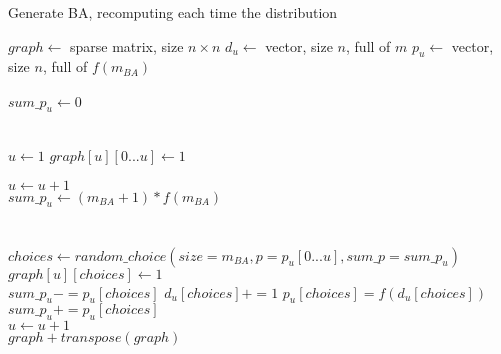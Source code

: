 \begin{algorithm}
	\caption{Generate BA, recomputing each time the distribution}
	\label{algo:ba}
	\begin{algorithmic}[1]
		
		\State $graph \gets$ sparse matrix, size $n\times n$
		\State $d_u \gets$ vector, size $n$, full of $m$ 
		\State $p_u \gets$ vector, size $n$, full of $f(m_{BA})$
		\\ 
		\\
		\State $sum\_p_u \gets 0$  
		
		\\
		\State $u \gets 1$
		 
		\State $graph[u][0...u] \gets 1$
		
		\State $u \gets u+1$
		\EndWhile
		\\
		\State $sum\_p_u \gets (m_{BA}+1)*f(m_{BA})$ 
		\\
		\\
		 
		\\
		\State $choices \gets random\_choice(size=m_{BA},p=p_u[0...u], sum\_p=sum\_p_u)$
		\\
		\State $graph[u][choices] \gets 1$ 
		\\
		\State $sum\_p_u-=p_u[choices]$	
		\State $d_u[choices]+=1$
		\State $p_u[choices]=f(d_u[choices])$
		\State $sum\_p_u +=p_u[choices]$
		\\
		
		\State $u \gets u+1$
		\EndWhile
		\\	
		\State \Return $graph+transpose(graph)$
		\EndFunction
	\end{algorithmic}

\end{algorithm}

